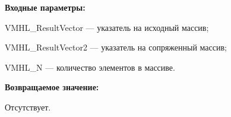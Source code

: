 \textbf{Входные параметры:}
 
VMHL\_ResultVector --- указатель на исходный массив;
 
VMHL\_ResultVector2 --- указатель на сопряженный массив;
 
VMHL\_N --- количество элементов в массиве.

\textbf{Возвращаемое значение:}

Отсутствует.